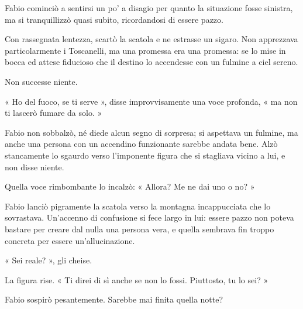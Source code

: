 Fabio cominciò a sentirsi un po' a disagio per quanto la situazione
fosse sinistra, ma si tranquillizzò quasi subito, ricordandosi di essere
pazzo.

Con rassegnata lentezza, scartò la scatola e ne estrasse un sigaro. Non
apprezzava particolarmente i Toscanelli, ma una promessa era una
promessa: se lo mise in bocca ed attese fiducioso che il destino lo
accendesse con un fulmine a ciel sereno.

Non successe niente.

« Ho del fuoco, se ti serve », disse improvvisamente una voce profonda,
« ma non ti lascerò fumare da solo. »

Fabio non sobbalzò, né diede alcun segno di sorpresa; si aspettava un
fulmine, ma anche una persona con un accendino funzionante sarebbe
andata bene. Alzò stancamente lo sgaurdo verso l'imponente figura che si
stagliava vicino a lui, e non disse niente.

Quella voce rimbombante lo incalzò: « Allora? Me ne dai uno o no? »

Fabio lanciò pigramente la scatola verso la montagna incappucciata che
lo sovrastava. Un'accenno di confusione si fece largo in lui: essere
pazzo non poteva bastare per creare dal nulla una persona vera, e quella
sembrava fin troppo concreta per essere un'allucinazione.

« Sei reale? », gli cheise.

La figura rise. « Ti direi di sì anche se non lo fossi. Piuttosto, tu lo
sei? »

Fabio sospirò pesantemente. Sarebbe mai finita quella notte?
